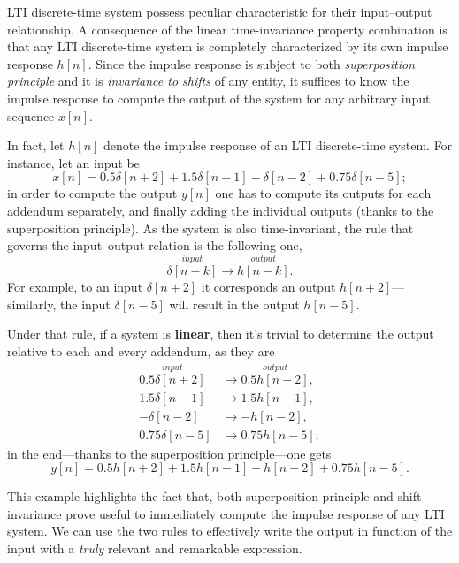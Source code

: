 \documentclass[\documentfontsize, twocolumn]{\classname}
\begin{document}
LTI discrete-time system possess peculiar characteristic for their input--output relationship. A consequence of the linear time-invariance property combination is that any LTI discrete-time system is completely characterized by its own impulse response $h[n]$. Since the impulse response is subject to both \emph{superposition principle} and it is \emph{invariance to shifts} of any entity, it suffices to know the impulse response to compute the output of the system for any arbitrary input sequence $x[n]$.

In fact, let $h[n]$ denote the impulse response of an LTI discrete-time system. For instance, let an input be
\[
    x[n] = 0.5\delta[n+2] + 1.5\delta[n-1] - \delta[n-2] + 0.75\delta[n-5];
\]
in order to compute the output $y[n]$ one has to compute its outputs for each addendum separately, and finally adding the individual outputs (thanks to the superposition principle). As the system is also time-invariant, the rule that governs the input--output relation is the following one,
\begin{equation}\label{eqn:impulseResponseLTI}
    \overset{input}{\delta[n-k]} \longrightarrow \overset{output}{h[n-k]}.
\end{equation}
For example, to an input $\delta[n+2]$ it corresponds an output $h[n+2]$---similarly, the input $\delta[n-5]$ will result in the output $h[n-5]$.

Under that rule, if a system is \textbf{linear}, then it's trivial to determine the output relative to each and every addendum, as they are
\begin{align*}
    \overset{input}{0.5\delta[n+2]} & \longrightarrow \overset{output}{0.5h[n+2]},\\
    1.5\delta[n-1] & \longrightarrow 1.5h[n-1],\\
    -\delta[n-2] & \longrightarrow -h[n-2],\\
    0.75\delta[n-5] & \longrightarrow 0.75h[n-5];
\end{align*}
in the end---thanks to the superposition principle---one gets
\[
    y[n] = 0.5h[n+2] + 1.5h[n-1] - h[n-2] + 0.75h[n-5].
\]

This example highlights the fact that, both superposition principle and shift-invariance prove useful to immediately compute the impulse response of any LTI system. We can use the two rules to effectively write the output in function of the input with a \emph{truly} relevant and remarkable expression.
\end{document}
